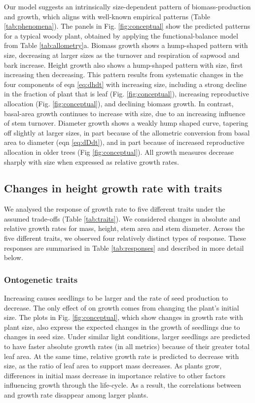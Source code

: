 \documentclass[9pt,twocolumn,twoside,lineno]{pnas-new}
\begin{document}
Our model suggests an intrinsically size-dependent pattern of biomass-production and growth, which aligns with well-known empirical patterns (Table \ref{tab:phenomena}). The panels in Fig. \ref{fig:conceptual} show the predicted patterns for a typical woody plant, obtained by applying the functional-balance model from Table \ref{tab:allometry}a. Biomass growth shows a hump-shaped pattern with size, decreasing at larger sizes as the turnover and respiration of sapwood and bark increase. Height growth also shows a hump-shaped pattern with size, first increasing then decreasing. This pattern results from systematic changes in the four components of eqn \ref{eq:dhdt} with increasing size, including a strong decline in the fraction of plant that is leaf (Fig. \ref{fig:conceptual}), increasing reproductive allocation (Fig. \ref{fig:conceptual}), and declining biomass growth. In contrast, basal-area growth continues to increase with size, due to an increasing influence of stem turnover. Diameter growth shows a weakly hump shaped curve, tapering off slightly at larger sizes, in part because of the allometric conversion from basal area to diameter (eqn \ref{eq:dDdt}), and in part because of increased reproductive allocation in older trees (Fig \ref{fig:conceptual}). All growth measures decrease sharply with size when expressed as relative growth rates.

\subsection{Changes in height growth rate with traits}

We analysed the response of growth rate to five different traits under the assumed trade-offs (Table \ref{tab:traits}). We considered changes in absolute and relative growth rates for mass, height, stem area and stem diameter. Across the five different traits, we observed four relatively distinct types of response. These responses are summarised in Table \ref{tab:responses} and described in more detail below.

\subsubsection{Ontogenetic traits}  Increasing {\seed} causes seedlings to be larger and the rate of seed production to decrease. The only effect of {\seed} on growth comes from changing the plant's initial size. The plots in Fig. \ref{fig:conceptual}, which show changes in growth rate with plant size, also express the expected changes in the growth of seedlings due to changes in seed size. Under similar light conditions, larger seedlings are predicted to have faster absolute growth rates (in all metrics) because of their greater total leaf area. At the same time, relative growth rate is predicted to decrease with size, as the ratio of leaf area to support mass decreases. As plants grow, differences in initial mass decrease in importance relative to other factors influencing growth through the life-cycle. As a result, the correlations between {\seed} and growth rate disappear among larger plants.
\end{document}
